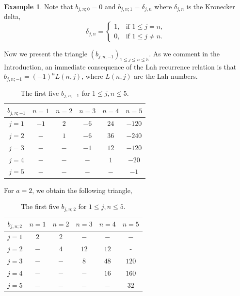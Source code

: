 \documentclass[a4paper,12pt]{amsart}
\theoremstyle{definition}
\newtheorem{example}[thm]{Example}
\theoremstyle{remark}
\begin{document}
\begin{example}{\rm


Note that $b_{j,n;0}=0$ and $b_{j,n;1}=\delta_{j,n}$ where $\delta_{j,n}$ is the Kronecker delta,
$$
\delta_{j,n} = \begin{cases}
1, & \text{if } 1\le j = n, \\
0, & \text{if } 1\le j \neq n.
\end{cases}
$$}







Now we present the triangle $(b_{j,n;-1})_{1\le j\le n\le 5}$. As we comment in the Introduction,  an immediate consequence of the Lah recurrence relation is that $b_{j,n;-1}=(-1)^nL(n,j)$, where $L(n,j)$ are the Lah numbers.

\begin{table}[h]\label{Tableb-1}\small{
\centering
\begin{tabular}{c|ccccc}
$b_{j,n;-1}$ & $n=1$ & $n=2$ & $n=3$ & $n=4$ & $n=5$ \\ \hline
$j=1$ & $-1$ & $2$ & $-6$ & $24$& $-120$ \\
$j=2$ & $-$ & $1$ & $-6$ & $36$ & $-240$ \\
$j=3$ & $-$ & $-$ & $-1$ & $12$ & $-120$ \\
$j=4$ & $-$ & $-$ & $-$ & $1$ & $-20$ \\
$j=5$ & $-$ & $-$ & $-$ & $-$ & $-1$ \\
\end{tabular}}
\vspace{2pt}
\caption{\small The first five $b_{j,n;-1}$ for $1\le j,n\le 5.$}
\end{table}



\end{example}
For $a=2$, we obtain the following triangle,

\begin{table}[h]\label{Tableb2}\small{
\centering
\begin{tabular}{c|ccccc}
$b_{j,n;2}$ & $n=1$ & $n=2$ & $n=3$ & $n=4$ & $n=5$ \\ \hline
$j=1$ & $2$ & $2$ & $-$ & $-$ & $-$ \\
$j=2$ & $-$ & $4$ & $12$ & $12$ & - \\
$j=3$ & $-$ & $-$ & $8$ & $48$ & $120$ \\
$j=4$ & $-$ & $-$ & $-$ & $16$ & $160$ \\
$j=5$ & $-$ & $-$ & $-$ & $-$ & $32$\\
\end{tabular}}
\vspace{2pt}
\caption{\small The first five $b_{j,n;2}$ for $1\le j,n\le 5.$}
\end{table}
\end{document}
